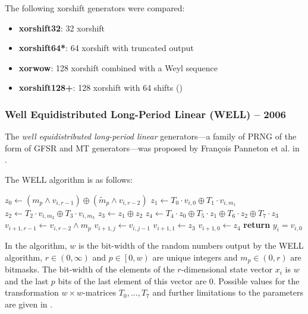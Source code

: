     The following xorshift generators were compared:
    \begin{itemize}
        \itemsep0em
        \item \textbf{xorshift32}: \SI{32}{\bit} xorshift
        \item \textbf{xorshift64*}: \SI{64}{\bit} xorshift with truncated output
        \item \textbf{xorwow}: \SI{128}{\bit} xorshift combined with a Weyl sequence
        \item \textbf{xorshift128+}: \SI{128}{\bit} xorshift with \SI{64}{\bit} shifts (\cite{Vigna:2017})
    \end{itemize}

\subsubsection[Well Equidistributed Long-Period Linear (WELL) -- 2006]{Well Equidistributed Long-Period Linear (WELL) -- 2006} \label{subsubsec:well}

    The \emph{well equidistributed long-period linear} generators---a family of PRNG of the form of GFSR and MT generators---was proposed by François Panneton et al. in \cite{Panneton:2006}.

    The WELL algorithm is as follows:
    \begin{algorithmic}[]
        \State $z_0 \leftarrow \left(m_p \land v_{i, r - 1}\right) \oplus \left(\widetilde{m}_p \land v_{i, r - 2}\right)$
        \State $z_1 \leftarrow T_0 \cdot v_{i, 0} \oplus T_1 \cdot v_{i, m_1}$
        \State $z_2 \leftarrow T_2 \cdot v_{i, m_2} \oplus T_3 \cdot v_{i, m_3}$
        \State $z_3 \leftarrow z_1 \oplus z_2$
        \State $z_4 \leftarrow T_4 \cdot z_0 \oplus T_5 \cdot z_1 \oplus T_6 \cdot z_2 \oplus T_7 \cdot z_3$
        \State $v_{i + 1, r - 1} \leftarrow v_{i, r - 2} \land m_p$
            \State $v_{i + 1, j} \leftarrow v_{i, j - 1}$
        \EndFor
        \State $v_{i + 1, 1} \leftarrow z_3$
        \State $v_{i + 1, 0} \leftarrow z_4$
        \State \textbf{return} $y_i = v_{i, 0}$
    \end{algorithmic}
    In the algorithm, $w$ is the bit-width of the random numbers output by the WELL algorithm, $r \in \left(0, \infty\right)$ and $p \in \left[0, w\right)$ are unique integers and $m_p \in \left(0, r\right)$ are bitmasks. The bit-width of the elements of the $r$-dimensional state vector $x_i$ is $w$ and the last $p$ bits of the last element of this vector are $0$. Possible values for the transformation $w{\times}w$-matrices $T_0, ..., T_7$ and further limitations to the parameters are given in \cite{Panneton:2006}.

